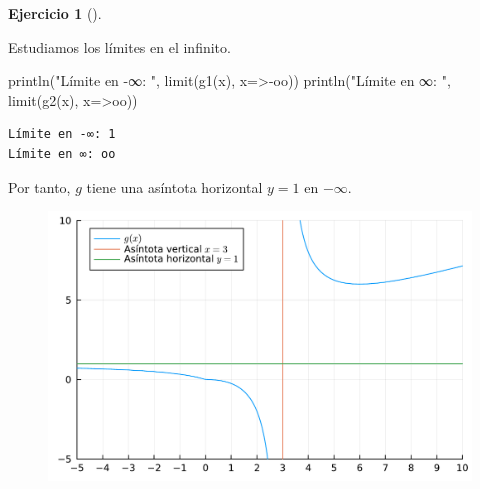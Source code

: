 \documentclass[
  a4paper,
]{scrreport}
\newenvironment{Shaded}{\begin{snugshade}}{\end{snugshade}}
\newcommand{\FloatTok}[1]{\textcolor[rgb]{0.68,0.00,0.00}{#1}}
\newcommand{\FunctionTok}[1]{\textcolor[rgb]{0.28,0.35,0.67}{#1}}
\newcommand{\NormalTok}[1]{\textcolor[rgb]{0.00,0.23,0.31}{#1}}
\newcommand{\OperatorTok}[1]{\textcolor[rgb]{0.37,0.37,0.37}{#1}}
\newcommand{\SpecialCharTok}[1]{\textcolor[rgb]{0.37,0.37,0.37}{#1}}
\newcommand{\StringTok}[1]{\textcolor[rgb]{0.13,0.47,0.30}{#1}}
\theoremstyle{definition}
\newtheorem{exercise}{Ejercicio}[chapter]
\theoremstyle{remark}
\begin{document}
\begin{exercise}[]
\begin{tcolorbox}
Estudiamos los límites en el infinito.

\begin{Shaded}
\begin{Highlighting}[]
\FunctionTok{println}\NormalTok{(}\StringTok{"Límite en {-}∞: "}\NormalTok{, }\FunctionTok{limit}\NormalTok{(}\FunctionTok{g1}\NormalTok{(x), x}\OperatorTok{=\textgreater{}{-}}\NormalTok{oo))}
\FunctionTok{println}\NormalTok{(}\StringTok{"Límite en ∞: "}\NormalTok{, }\FunctionTok{limit}\NormalTok{(}\FunctionTok{g2}\NormalTok{(x), x}\OperatorTok{=\textgreater{}}\NormalTok{oo))}
\end{Highlighting}
\end{Shaded}

\begin{verbatim}
Límite en -∞: 1
Límite en ∞: oo
\end{verbatim}

Por tanto, \(g\) tiene una asíntota horizontal \(y=1\) en \(-\infty\).

\begin{Shaded}
\end{Shaded}

\begin{figure}[H]

{\centering \includegraphics{./limites_files/figure-pdf/cell-28-output-1.pdf}

}

\end{figure}


\end{tcolorbox}
\end{exercise}
\end{document}
